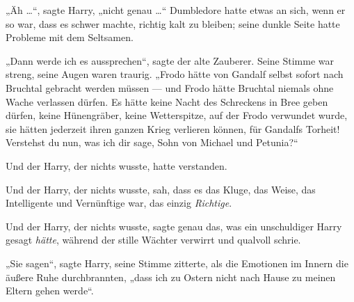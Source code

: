 „Äh …“, sagte Harry, „nicht genau …“ Dumbledore hatte etwas an sich, wenn er so war, dass es schwer machte, richtig kalt zu bleiben; seine dunkle Seite hatte Probleme mit dem Seltsamen.

„Dann werde ich es aussprechen“, sagte der alte Zauberer. Seine Stimme war streng, seine Augen waren traurig.
„Frodo hätte von Gandalf selbst sofort nach Bruchtal gebracht werden müssen — und Frodo hätte Bruchtal niemals ohne Wache verlassen dürfen. Es hätte keine Nacht des Schreckens in Bree geben dürfen, keine Hünengräber, keine Wetterspitze, auf der Frodo verwundet wurde, sie hätten jederzeit ihren ganzen Krieg verlieren können, für Gandalfs Torheit! Verstehst du nun, was ich dir sage, Sohn von Michael und Petunia?“

Und der Harry, der nichts wusste, hatte verstanden.

Und der Harry, der nichts wusste, sah, dass es das Kluge, das Weise, das Intelligente und Vernünftige war, das einzig \emph{Richtige}.

Und der Harry, der nichts wusste, sagte genau das, was ein unschuldiger Harry gesagt \emph{hätte}, während der stille Wächter verwirrt und qualvoll schrie.

„Sie sagen“, sagte Harry, seine Stimme zitterte, als die Emotionen im Innern die äußere Ruhe durchbrannten, „dass ich zu Ostern nicht nach Hause zu meinen Eltern gehen werde“.

